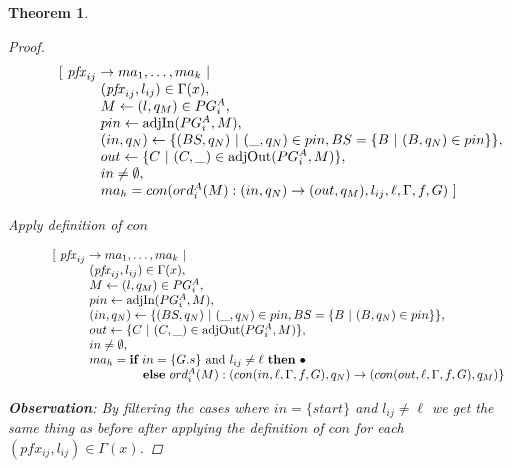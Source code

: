 \documentclass[twocolumn, openany]{sig-alternate-10pt}
\newtheorem{thm}{Theorem}
\begin{document}
\begin{thm}
\begin{proof}
  \[ \begin{array}{l}
     ~~~~~~~~~ [~ \mathit{pfx}_{ij} \rightarrow ma_1, \dots, ma_k ~\vert~ \\ 
     ~~~~~~~~~~~~~~~~~~ (\mathit{pfx}_{ij},l_{ij}) \in \Gamma(x), \\
     ~~~~~~~~~~~~~~~~~~ M \leftarrow (l,q_M) \in PG^A_i, \\
     ~~~~~~~~~~~~~~~~~~ pin \leftarrow \text{adjIn}(PG^A_i,M), \\
     ~~~~~~~~~~~~~~~~~~ (in,q_N) \leftarrow \{ (BS,q_N) ~\vert~ (\_,q_N) \in pin, BS=\{B ~\vert~ (B,q_N) \in pin \} \}, \\
     ~~~~~~~~~~~~~~~~~~ out \leftarrow \{ C ~\vert~ (C,\_) \in \text{adjOut}(PG^A_i,M) \}, \\
     ~~~~~~~~~~~~~~~~~~ in \neq \emptyset, \\
     ~~~~~~~~~~~~~~~~~~ ma_h = con(ord^A_i(M) : (in,q_N) \rightarrow (out,q_M),l_{ij},\ell,\Gamma,f,G) ~] \\
  \end{array} \]%

  Apply definition of $con$

  \[ \begin{array}{l}
     ~~~~~~~~~ [~ \mathit{pfx}_{ij} \rightarrow ma_1, \dots, ma_k ~\vert~ \\ 
     ~~~~~~~~~~~~~~~~~~ (\mathit{pfx}_{ij},l_{ij}) \in \Gamma(x), \\
     ~~~~~~~~~~~~~~~~~~ M \leftarrow (l,q_M) \in PG^A_i, \\
     ~~~~~~~~~~~~~~~~~~ pin \leftarrow \text{adjIn}(PG^A_i,M), \\
     ~~~~~~~~~~~~~~~~~~ (in,q_N) \leftarrow \{ (BS,q_N) ~\vert~ (\_,q_N) \in pin, BS=\{B ~\vert~ (B,q_N) \in pin \} \}, \\
     ~~~~~~~~~~~~~~~~~~ out \leftarrow \{ C ~\vert~ (C,\_) \in \text{adjOut}(PG^A_i,M) \}, \\
     ~~~~~~~~~~~~~~~~~~ in \neq \emptyset, \\
     ~~~~~~~~~~~~~~~~~~ ma_h = \textbf{if}~ in=\{ G.s \} \text{ and } l_{ij} \neq \ell ~\textbf{then}~ \bullet \\ 
     ~~~~~~~~~~~~~~~~~~~~~~~~~~~~~~~ \textbf{else}~ ord^A_i(M) : (con(in,\ell,\Gamma,f,G),q_N) \rightarrow (con(out,\ell,\Gamma,f,G),q_M) \} \\
  \end{array} \]%

  \textbf{Observation}: 
  By filtering the cases where $in = \{ \mathit{start} \}$ and $l_{ij} \neq \ell$ we get the same thing as before after applying the definition of $con$ for each $(pfx_{ij}, l_{ij}) \in \Gamma(x)$.


\end{proof}
\end{thm}
\end{document}
